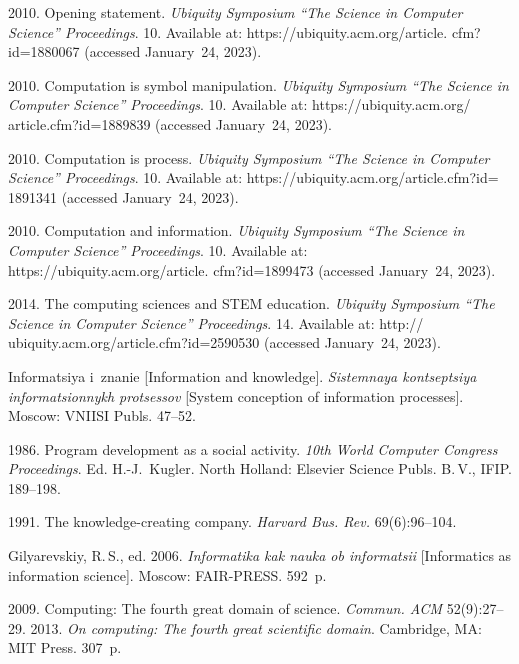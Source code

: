 \begin{multicols}{2}
{{\begin{thebibliography}{99}
 2010. Opening statement. \textit{Ubiquity Symposium ``The Science in 
Computer Science'' Proceedings}. 10. Available at: {\sf  
https://ubiquity.acm.org/article. cfm?id=1880067} (accessed January~24, 2023).

 2010. Computation is symbol manipulation. \textit{Ubiquity Symposium ``The 
Science in Computer Science'' Proceedings}. 10. Available at: 
{\sf https://ubiquity.acm.org/ article.cfm?id=1889839} (accessed January~24, 2023).



 2010. Computation is process. \textit{Ubiquity Symposium ``The Science in 
Computer Science'' Proceedings}. 10. Available at: {\sf  
https://ubiquity.acm.org/article.cfm?id= 1891341} (accessed January~24, 2023).

 2010. Computation and information. \textit{Ubiquity Symposium ``The Science in 
Computer Science'' Proceedings}. 10. Available at: {\sf  
https://ubiquity.acm.org/article. cfm?id=1899473} (accessed January~24, 2023).


 2014. The computing sciences and STEM education. \textit{Ubiquity 
Symposium ``The Science in Computer Science'' Proceedings}. 14. Available at:  
{\sf http:// ubiquity.acm.org/article.cfm?id=2590530} (accessed January~24, 2023).



 Informatsiya i~znanie [Information and knowledge]. \textit{Sistemnaya 
kontseptsiya informatsionnykh protsessov} [System conception of information processes]. Moscow: 
VNIISI Publs. 47--52.

 1986. Program development as a social activity. \textit{10th World Computer 
Congress Proceedings}. Ed. \mbox{H.-J.}~Kugler. North Holland: Elsevier Science Publs. B.\,V., IFIP. 
189--198.



 1991. The knowledge-creating company. \textit{Harvard Bus. Rev.}  
69(6):96--104.

Gilyarevskiy, R.\,S., ed. 2006. \textit{Informatika kak nauka ob informatsii} [Informatics as 
information science]. Moscow: FAIR-PRESS. 592~p.


 2009. Computing: The fourth great domain of science. 
\textit{Commun. ACM} 52(9):27--29.
 2013. \textit{On computing: The fourth great scientific domain}. 
Cambridge, MA: MIT Press. 307~p.


\end{thebibliography}}}
\end{multicols}
